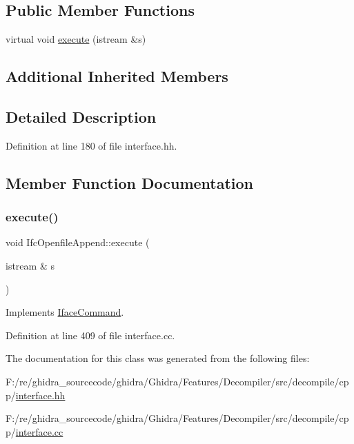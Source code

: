 \subsection*{Public Member Functions}
\begin{DoxyCompactItemize}
\item 
virtual void \mbox{\hyperlink{class_ifc_openfile_append_aa3f7ac9ff923f0278e92962dd1ed6b67}{execute}} (istream \&s)
\end{DoxyCompactItemize}
\subsection*{Additional Inherited Members}


\subsection{Detailed Description}


Definition at line 180 of file interface.\+hh.



\subsection{Member Function Documentation}
\mbox{\label{class_ifc_openfile_append_aa3f7ac9ff923f0278e92962dd1ed6b67}} 
\subsubsection{\texorpdfstring{execute()}{execute()}}
{\footnotesize\ttfamily void Ifc\+Openfile\+Append\+::execute (\begin{DoxyParamCaption}\item[{istream \&}]{s }\end{DoxyParamCaption})\hspace{0.3cm}{\ttfamily [virtual]}}



Implements \mbox{\hyperlink{class_iface_command_af10e29cee2c8e419de6efe9e680ad201}{Iface\+Command}}.



Definition at line 409 of file interface.\+cc.



The documentation for this class was generated from the following files\+:\begin{DoxyCompactItemize}
\item 
F\+:/re/ghidra\+\_\+sourcecode/ghidra/\+Ghidra/\+Features/\+Decompiler/src/decompile/cpp/\mbox{\hyperlink{interface_8hh}{interface.\+hh}}\item 
F\+:/re/ghidra\+\_\+sourcecode/ghidra/\+Ghidra/\+Features/\+Decompiler/src/decompile/cpp/\mbox{\hyperlink{interface_8cc}{interface.\+cc}}\end{DoxyCompactItemize}
